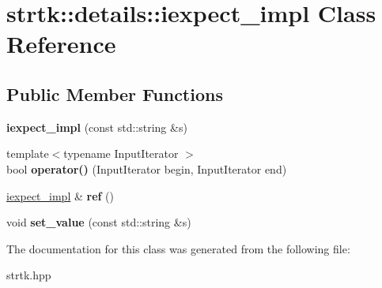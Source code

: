 \hypertarget{classstrtk_1_1details_1_1iexpect__impl}{\section{strtk\-:\-:details\-:\-:iexpect\-\_\-impl Class Reference}
\label{classstrtk_1_1details_1_1iexpect__impl}
}
\subsection*{Public Member Functions}
\begin{DoxyCompactItemize}
\item 
\hypertarget{classstrtk_1_1details_1_1iexpect__impl_a916f2895766f89ba8cdaa1b41d92855e}{{\bfseries iexpect\-\_\-impl} (const std\-::string \&s)}\label{classstrtk_1_1details_1_1iexpect__impl_a916f2895766f89ba8cdaa1b41d92855e}

\item 
\hypertarget{classstrtk_1_1details_1_1iexpect__impl_ae8cac250ad5fcd5ba7e12da5b6ca391b}{{\footnotesize template$<$typename Input\-Iterator $>$ }\\bool {\bfseries operator()} (Input\-Iterator begin, Input\-Iterator end)}\label{classstrtk_1_1details_1_1iexpect__impl_ae8cac250ad5fcd5ba7e12da5b6ca391b}

\item 
\hypertarget{classstrtk_1_1details_1_1iexpect__impl_a5ddd926e05ab0baf38c21964eb100cab}{\hyperlink{classstrtk_1_1details_1_1iexpect__impl}{iexpect\-\_\-impl} \& {\bfseries ref} ()}\label{classstrtk_1_1details_1_1iexpect__impl_a5ddd926e05ab0baf38c21964eb100cab}

\item 
\hypertarget{classstrtk_1_1details_1_1iexpect__impl_a85d4550de4f4e64365f5ba24d238bb20}{void {\bfseries set\-\_\-value} (const std\-::string \&s)}\label{classstrtk_1_1details_1_1iexpect__impl_a85d4550de4f4e64365f5ba24d238bb20}

\end{DoxyCompactItemize}


The documentation for this class was generated from the following file\-:\begin{DoxyCompactItemize}
\item 
strtk.\-hpp\end{DoxyCompactItemize}
